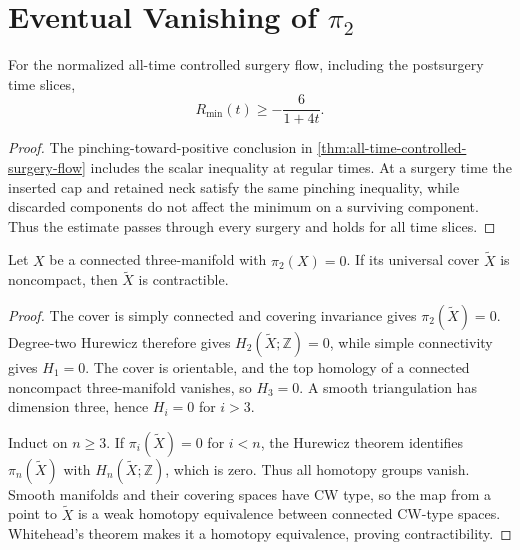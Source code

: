 \section{Eventual Vanishing of \texorpdfstring{$\pi_2$}{pi2}}

\begin{lemma}
\label{lem:extinction-scalar-curvature-lower-bound}
\notready
For the normalized all-time controlled surgery flow, including the
postsurgery time slices,
\[
 R_{\min}(t)\ge-\frac6{1+4t}.
\]
\end{lemma}

\begin{proof}
The pinching-toward-positive conclusion in
\ref{thm:all-time-controlled-surgery-flow} includes the scalar inequality at
regular times.  At a surgery time the inserted cap and retained neck satisfy
the same pinching inequality, while discarded components do not affect the
minimum on a surviving component.  Thus the estimate passes through every
surgery and holds for all time slices.
\end{proof}

\begin{theorem}
\label{thm:noncompact-two-connected-cover-contractible}
\notready
Let $X$ be a connected three-manifold with $\pi_2(X)=0$.  If its universal
cover $\widetilde X$ is noncompact, then $\widetilde X$ is contractible.
\end{theorem}

\begin{proof}
The cover is simply connected and covering invariance gives
$\pi_2(\widetilde X)=0$.  Degree-two Hurewicz therefore gives
$H_2(\widetilde X;\mathbb Z)=0$, while simple connectivity gives $H_1=0$.
The cover is orientable, and the top homology of a connected noncompact
three-manifold vanishes, so $H_3=0$.  A smooth triangulation has dimension
three, hence $H_i=0$ for $i>3$.

Induct on $n\ge3$.  If $\pi_i(\widetilde X)=0$ for $i<n$, the Hurewicz
theorem identifies $\pi_n(\widetilde X)$ with $H_n(\widetilde X;\mathbb Z)$,
which is zero.  Thus all homotopy groups vanish.  Smooth manifolds and their
covering spaces have CW type, so the map from a point to $\widetilde X$ is a
weak homotopy equivalence between connected CW-type spaces.  Whitehead's
theorem makes it a homotopy equivalence, proving contractibility.
\end{proof}

